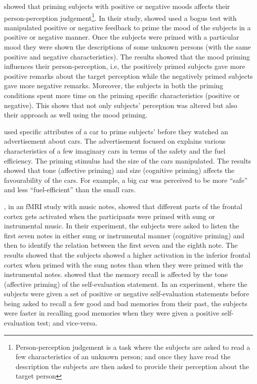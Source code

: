 \documentclass[lettersize, noapacite, twoside, HRI]{apa_HRI}
\begin{document}
\cite{forgas1987mood} showed that priming subjects with positive or negative moods affects their person-perception judgement\footnote{Person-perception judgement is a task where the subjects are asked to read a few characteristics of an unknown person; and once they have read the description the subjects are then asked to provide their perception about the target person}. In their study, \cite{forgas1987mood} showed used a bogus test with manipulated positive or negative feedback to prime the mood of the subjects in a positive or negative manner. Once the subjects were primed with a particular mood they were shown the descriptions of some unknown persons (with the same positive and negative characteristics). The results showed that the mood priming influences their person-perception, i.e, the positively primed subjects gave more positive remarks about the target perception while the negatively primed subjects gave more negative remarks. Moreover, the subjects in both the priming conditions spent more time on the priming specific characteristics (positive or negative). This shows that not only subjects' perception was altered but also their approach as well using the mood priming.

\cite{yi1990cognitive} used specific attributes of a car to prime subjects' before they watched an advertisement about cars. The advertisement focused on explains various characteristics of a few imaginary cars in terms of the safety and the fuel efficiency. The priming stimulus had the size of the cars manipulated. The results showed that tone (affective priming) and size (cognitive priming) affects the favourability of the cars. For example, a big car was perceived to be more ``safe'' and less ``fuel-efficient'' than the small cars.

\cite{tillmann2006cognitive}, in an fMRI study with music notes, showed that different parts of the frontal cortex gets activated when the participants were primed with sung or instrumental music. In their experiment, the subjects were asked to listen the first seven notes in either sung or instrumental manner (cognitive priming) and then to identify the relation between the first seven and the eighth note. The results showed that the subjects showed a higher activation in the inferior frontal cortex when primed with the sung notes than when they were primed with the instrumental notes. \cite{rholes1987emotional} showed that the memory recall is affected by the tone (affective priming) of the self-evaluation statement. In an experiment, where the subjects were given a set of positive or negative self-evaluation statements before being asked to recall a few good and bad memories from their past, the subjects were faster in recalling good memories when they were given a positive self-evaluation test; and vice-versa.
\end{document}
